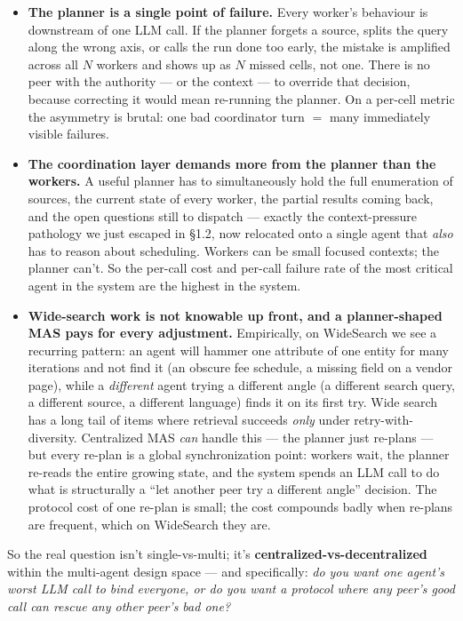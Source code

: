 \documentclass[11pt]{article}
\begin{document}
\begin{itemize}[leftmargin=1.2em]
  \item \textbf{The planner is a single point of failure.} Every worker's behaviour is downstream of one LLM call. If the planner forgets a source, splits the query along the wrong axis, or calls the run done too early, the mistake is amplified across all $N$ workers and shows up as $N$ missed cells, not one. There is no peer with the authority --- or the context --- to override that decision, because correcting it would mean re-running the planner. On a per-cell metric the asymmetry is brutal: one bad coordinator turn $=$ many immediately visible failures.
  \item \textbf{The coordination layer demands more from the planner than the workers.} A useful planner has to simultaneously hold the full enumeration of sources, the current state of every worker, the partial results coming back, and the open questions still to dispatch --- exactly the context-pressure pathology we just escaped in \S1.2, now relocated onto a single agent that \emph{also} has to reason about scheduling. Workers can be small focused contexts; the planner can't. So the per-call cost and per-call failure rate of the most critical agent in the system are the highest in the system.
  \item \textbf{Wide-search work is not knowable up front, and a planner-shaped MAS pays for every adjustment.} Empirically, on WideSearch we see a recurring pattern: an agent will hammer one attribute of one entity for many iterations and not find it (an obscure fee schedule, a missing field on a vendor page), while a \emph{different} agent trying a different angle (a different search query, a different source, a different language) finds it on its first try. Wide search has a long tail of items where retrieval succeeds \emph{only} under retry-with-diversity. Centralized MAS \emph{can} handle this --- the planner just re-plans --- but every re-plan is a global synchronization point: workers wait, the planner re-reads the entire growing state, and the system spends an LLM call to do what is structurally a ``let another peer try a different angle'' decision. The protocol cost of one re-plan is small; the cost compounds badly when re-plans are frequent, which on WideSearch they are.
\end{itemize}

So the real question isn't single-vs-multi; it's \textbf{centralized-vs-decentralized} within the multi-agent design space --- and specifically: \emph{do you want one agent's worst LLM call to bind everyone, or do you want a protocol where any peer's good call can rescue any other peer's bad one?}
\end{document}
